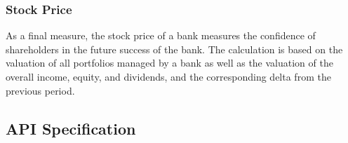 \subsubsection{Stock Price}
As a final measure, the stock price of a bank measures the confidence of shareholders in the future success of the bank. The calculation is based on the  valuation of all portfolios managed by a bank as well as the valuation of the overall income, equity, and dividends, and the corresponding delta from the previous period.


\subsection{API Specification}
